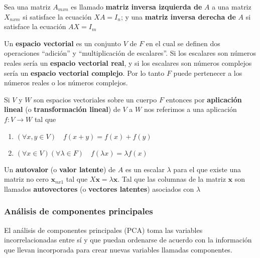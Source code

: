 \begin{defi}\citep{Blyth_2002}
    Sea una matriz $A_{mxn}$ es llamado \textbf{matriz inversa izquierda de} $A$ a una matriz $X_{nxm}$ si satisface la ecuación $XA=I_n$; y una \textbf{matriz inversa derecha de} $A$ si satisface la ecuación $AX=I_m$
\end{defi}

\begin{defi}\citep{Blyth_2002}
    Un \textbf{espacio vectorial} es un conjunto $V$ de $F$ en el cual se definen dos operaciones ``adición'' y ``multiplicación de escalares''. Si los escalares son números reales sería un \textbf{espacio vectorial real}, y si los escalares son números complejos sería un \textbf{espacio vectorial complejo}. Por lo tanto $F$ puede pertenecer a los números reales o los números complejos.
\end{defi}

\begin{defi}\citep{Blyth_2002}
    Si $V$ y $W$ son espacios vectoriales sobre un cuerpo $F$ entonces por \textbf{aplicación lineal} (o \textbf{transformación lineal}) de $V$ a $W$ nos referimos a una aplicación $f: V \to W $ tal que
    \begin{enumerate}
        \item $(\forall x,y \in V) \quad f(x+y)=f(x)+f(y)$
        \item $(\forall x \in V)(\forall \lambda \in F) \quad f(\lambda x)=\lambda f(x)$ 
    \end{enumerate}
\end{defi}

\begin{defi}\citep{Blyth_2002}
    Un \textbf{autovalor} (o \textbf{valor latente}) de $A$ es un escalar $\lambda$ para el que existe una matriz no cero $\mathbf{x}_{nx1}$ tal que $X\mathbf{x}=\lambda \mathbf{x}$. Tal que las columnas de la matriz $\mathbf{x}$ son llamados \textbf{autovectores} (o \textbf{vectores latentes}) asociados con $\lambda$
\end{defi}

\subsubsection{Análisis de componentes principales}
\citep{aldas2017analisis} El análisis de componentes principales (PCA) toma las variables incorrelacionadas entre sí y que puedan ordenarse de acuerdo con la información que llevan incorporada para crear nuevas variables llamadas componentes.

